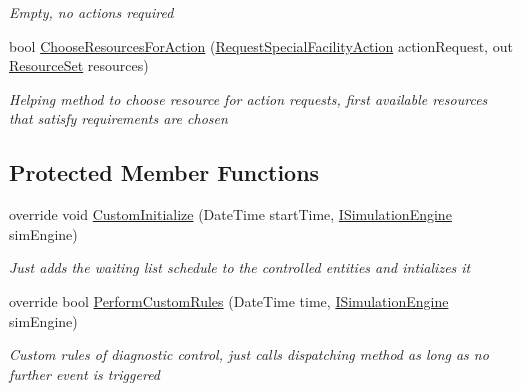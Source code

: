 \begin{DoxyCompactItemize}
\begin{DoxyCompactList}\small\item\em Empty, no actions required \end{DoxyCompactList}\item 
bool \hyperlink{class_sample_hospital_model_1_1_diagnostics_1_1_control_unit_special_treatment_model_diagnostics_af71052ff42f6af64c023eb63ae893ccd}{Choose\+Resources\+For\+Action} (\hyperlink{class_general_health_care_elements_1_1_special_facility_1_1_request_special_facility_action}{Request\+Special\+Facility\+Action} action\+Request, out \hyperlink{class_general_health_care_elements_1_1_resource_handling_1_1_resource_set}{Resource\+Set} resources)
\begin{DoxyCompactList}\small\item\em Helping method to choose resource for action requests, first available resources that satisfy requirements are chosen \end{DoxyCompactList}\end{DoxyCompactItemize}
\subsection*{Protected Member Functions}
\begin{DoxyCompactItemize}
\item 
override void \hyperlink{class_sample_hospital_model_1_1_diagnostics_1_1_control_unit_special_treatment_model_diagnostics_a7cc86268c66b811c20fbc13af3d22795}{Custom\+Initialize} (Date\+Time start\+Time, \hyperlink{interface_simulation_core_1_1_simulation_classes_1_1_i_simulation_engine}{I\+Simulation\+Engine} sim\+Engine)
\begin{DoxyCompactList}\small\item\em Just adds the waiting list schedule to the controlled entities and intializes it \end{DoxyCompactList}\item 
override bool \hyperlink{class_sample_hospital_model_1_1_diagnostics_1_1_control_unit_special_treatment_model_diagnostics_acdf02c25ff1a429804aca5d8ea135356}{Perform\+Custom\+Rules} (Date\+Time time, \hyperlink{interface_simulation_core_1_1_simulation_classes_1_1_i_simulation_engine}{I\+Simulation\+Engine} sim\+Engine)
\begin{DoxyCompactList}\small\item\em Custom rules of diagnostic control, just calls dispatching method as long as no further event is triggered \end{DoxyCompactList}\end{DoxyCompactItemize}
